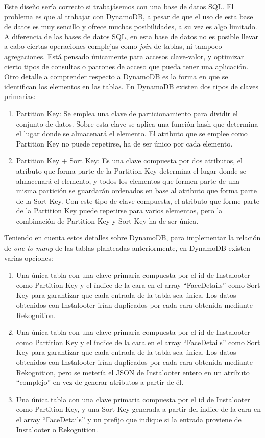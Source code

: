 Este diseño sería correcto si trabajásemos con una base de datos SQL. El problema es que al trabajar con DynamoDB, a pesar de que el uso de esta base de datos es muy sencillo y ofrece muchas posibilidades, a su vez es algo limitado. A diferencia de las bases de datos SQL, en esta base de datos no es posible llevar a cabo ciertas operaciones complejas como \textit{join} de tablas, ni tampoco agregaciones. Está pensado únicamente para accesos clave-valor, y optimizar cierto tipos de consultas o patrones de acceso que pueda tener una aplicación. Otro detalle a comprender respecto a DynamoDB es la forma en que se identifican los elementos en las tablas. En DynamoDB existen dos tipos de claves primarias:

\begin{enumerate}
    \item Partition Key: Se emplea una clave de particionamiento para dividir el conjunto de datos. Sobre esta clave se aplica una función hash que determina el lugar donde se almacenará el elemento. El atributo que se emplee como Partition Key no puede repetirse, ha de ser único por cada elemento.
    \item Partition Key + Sort Key: Es una clave compuesta por dos atributos, el atributo que forma parte de la Partition Key determina el lugar donde se almacenará el elemento, y todos los elementos que formen parte de una misma partición se guardarán ordenados en base al atributo que forma parte de la Sort Key. Con este tipo de clave compuesta, el atributo que forme parte de la Partition Key puede repetirse para varios elementos, pero la combinación de Partition Key y Sort Key ha de ser única.
\end{enumerate}

Teniendo en cuenta estos detalles sobre DynamoDB, para implementar la relación de \textit{one-to-many} de las tablas planteadas anteriormente, en DynamoDB existen varias opciones:
\begin{enumerate}
    \item Una única tabla con una clave primaria compuesta por el id de Instalooter como Partition Key y el índice de la cara en el array ``FaceDetails'' como Sort Key para garantizar que cada entrada de la tabla sea única. Los datos obtenidos con Instalooter irían duplicados por cada cara obtenida mediante Rekognition.
    \item Una única tabla con una clave primaria compuesta por el id de Instalooter como Partition Key y el índice de la cara en el array ``FaceDetails'' como Sort Key para garantizar que cada entrada de la tabla sea única. Los datos obtenidos con Instalooter irían duplicados por cada cara obtenida mediante Rekognition, pero se metería el JSON de Instalooter entero en un atributo ``complejo'' en vez de generar atributos a partir de él.
    \item Una única tabla con una clave primaria compuesta por el id de Instalooter como Partition Key, y una Sort Key generada a partir del índice de la cara en el array ``FaceDetails'' y un prefijo que indique si la entrada proviene de Instalooter o Rekognition.
\end{enumerate}


